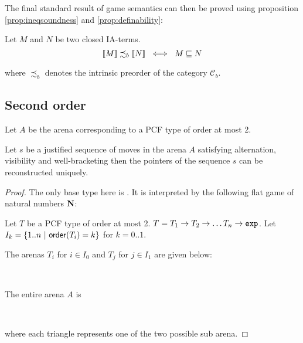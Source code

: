 The final standard result of game semantics can then be proved using proposition \ref{prop:ineqsoundness} and \ref{prop:definability}:
\begin{thm}
Let $M$ and $N$ be two closed IA-terms.
$${[\![ M ]\!]} \precsim_b {[\![ N ]\!]} \ \iff \ M \sqsubseteq N$$
\end{thm}

where $\precsim_b$ denotes the intrinsic preorder of the category $\mathcal{C}_b$.


\subsection{Second order}

\begin{lem}
Let $A$ be the arena corresponding to a PCF type of order at most 2.

Let $s$ be a justified sequence of moves in the arena $A$ satisfying
 alternation, visibility and well-bracketing then
the pointers of the sequence $s$ can be reconstructed uniquely.
\end{lem}



\begin{proof}
The only base type here is \typexp. It is interpreted by the
following flat game of natural numbers $\mathbf{N}$:
\begin{center}
    {   \TR{\ldots}
    }
\end{center}

Let $T$ be a PCF type of order at most 2. $T = T_1 \rightarrow T_2
\rightarrow \ldots T_n \rightarrow \texttt{exp}$. Let $I_k = \{ 1.. n\ |\
{\sf order}(T_i) = k \}$ for $k = 0..1$.

The arenas $T_i$ for $i \in I_0$ and $T_j$ for $j \in I_1$ are given
below:
\begin{center}
\
    {   \TR{\ldots} }
\hspace{2cm}
    {
        {   \TR{\ldots} }
      \TR{$1'_j$}  \TR{\ldots}
    }
\end{center}

The entire arena $A$ is
\begin{center}
\
    {
  
    \TR{1} \TR{2} \TR{\ldots} }
\end{center}

where each triangle represents one of the two possible sub arena.



\end{proof}


